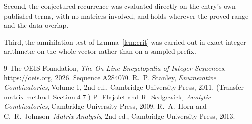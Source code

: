 \documentclass[11pt,a4paper]{article}
\theoremstyle{plain}
\theoremstyle{definition}
\begin{document}
Second, the conjectured recurrence was evaluated directly on the entry's own published terms,
with no matrices involved, and holds wherever the proved range and the data overlap.

Third, the annihilation test of Lemma~\ref{lem:crit} was carried out in exact integer
arithmetic on the whole vector rather than on a sampled prefix.

\begin{thebibliography}{9}
 The OEIS Foundation, \emph{The On-Line Encyclopedia of Integer
Sequences}, \url{https://oeis.org}, 2026. Sequence A284070.
 R.~P.~Stanley, \emph{Enumerative Combinatorics}, Volume 1, 2nd ed.,
Cambridge University Press, 2011. (Transfer-matrix method, Section 4.7.)
 P.~Flajolet and R.~Sedgewick, \emph{Analytic Combinatorics}, Cambridge
University Press, 2009.
 R.~A.~Horn and C.~R.~Johnson, \emph{Matrix Analysis}, 2nd ed., Cambridge
University Press, 2013.
\end{thebibliography}
\end{document}
